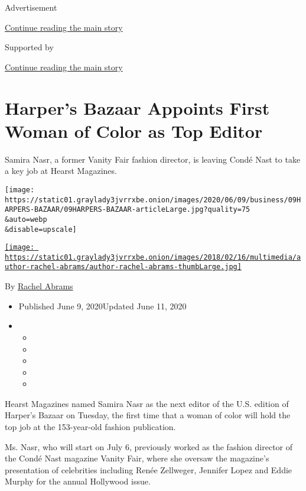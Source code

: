Advertisement

\protect\hyperlink{after-top}{Continue reading the main story}

Supported by

\protect\hyperlink{after-sponsor}{Continue reading the main story}

\hypertarget{harpers-bazaar-appoints-first-woman-of-color-as-top-editor}{%
\section{Harper's Bazaar Appoints First Woman of Color as Top
Editor}\label{harpers-bazaar-appoints-first-woman-of-color-as-top-editor}}

Samira Nasr, a former Vanity Fair fashion director, is leaving Condé
Nast to take a key job at Hearst Magazines.

\texttt{[image: https://static01.graylady3jvrrxbe.onion/images/2020/06/09/business/09HARPERS-BAZAAR/09HARPERS-BAZAAR-articleLarge.jpg?quality=75\\\&auto=webp\\\&disable=upscale]}

\href{https://www.nytimes3xbfgragh.onion/by/rachel-abrams}{\texttt{[image: https://static01.graylady3jvrrxbe.onion/images/2018/02/16/multimedia/author-rachel-abrams/author-rachel-abrams-thumbLarge.jpg]}}

By \href{https://www.nytimes3xbfgragh.onion/by/rachel-abrams}{Rachel
Abrams}

\begin{itemize}
\item
  Published June 9, 2020Updated June 11, 2020
\item
  \begin{itemize}
  \item
  \item
  \item
  \item
  \item
  \end{itemize}
\end{itemize}

Hearst Magazines named Samira Nasr as the next editor of the U.S.
edition of Harper's Bazaar on Tuesday, the first time that a woman of
color will hold the top job at the 153-year-old fashion publication.

Ms. Nasr, who will start on July 6, previously worked as the fashion
director of the Condé Nast magazine Vanity Fair, where she oversaw the
magazine's presentation of celebrities including Renée Zellweger,
Jennifer Lopez and Eddie Murphy for the annual Hollywood issue.

